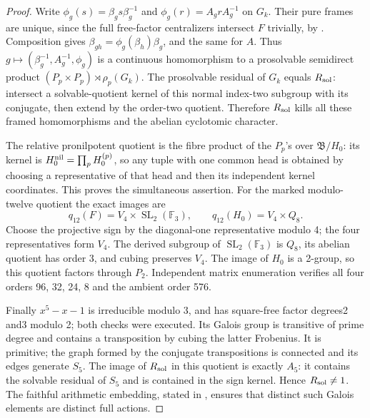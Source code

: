 \begin{proof}
Write \(\phi_g(s)=\beta_gs\beta_g^{-1}\) and
\(\phi_g(r)=A_grA_g^{-1}\) on \(G_k\). Their pure frames are
unique, since the full free-factor centralizers intersect \(F\)
trivially, by \citet[Theorem B']{SymHerfortRibes1985}.
Composition gives
\(\beta_{gh}=\phi_g(\beta_h)\beta_g\), and the same for \(A\).
Thus \(g\mapsto(\beta_g^{-1},A_g^{-1},\phi_g)\) is a continuous
homomorphism to a prosolvable semidirect product
\((P_p\times P_p)\rtimes\rho_p(G_k)\).
The prosolvable residual of \(G_k\) equals \(R_{\rm sol}\):
intersect a solvable-quotient kernel of this normal index-two subgroup
with its conjugate, then extend by the order-two quotient. Therefore
\(R_{\rm sol}\) kills all these framed homomorphisms and the abelian
cyclotomic character.

The relative pronilpotent quotient is the fibre product of the
\(P_p\)'s over \(\mathfrak B/H_0\): its kernel is
\(H_0^{\rm nil}=\prod_pH_0^{(p)}\), so any tuple with one common
head is obtained by choosing a representative of that head and then
its independent kernel coordinates. This proves the simultaneous
assertion. For the marked modulo-twelve quotient the exact images are
\[
 q_{12}(F)=V_4\times\operatorname{SL}_2(\mathbb F_3),\qquad
 q_{12}(H_0)=V_4\times Q_8.
\]
Choose the projective sign by the diagonal-one representative modulo 4;
the four representatives form \(V_4\). The derived subgroup of
\(\operatorname{SL}_2(\mathbb F_3)\) is \(Q_8\), its abelian
quotient has order 3, and cubing preserves \(V_4\). The image of
\(H_0\) is a 2-group, so this quotient factors through \(P_2\).
Independent matrix enumeration verifies all four orders 96, 32, 24, 8
and the ambient order 576.

Finally \(x^5-x-1\) is irreducible modulo 3, and has square-free
factor degrees2 and3 modulo 2; both checks were executed. Its Galois
group is transitive of prime degree and contains a transposition by
cubing the latter Frobenius. It is primitive; the graph formed by the
conjugate transpositions is connected and its edges generate \(S_5\).
The image of \(R_{\rm sol}\) in this quotient is exactly \(A_5\):
it contains the solvable residual of \(S_5\) and is contained in the
sign kernel. Hence \(R_{\rm sol}\ne1\). The faithful arithmetic
embedding, stated in \citet[Theorem 1, p.~573]{SymLochakSchneps1997},
ensures that distinct such Galois elements are distinct full actions.
\end{proof}

